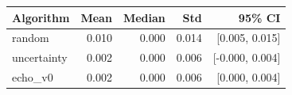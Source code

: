 \begin{tabular}{lrrrr}
\hline
Algorithm & Mean & Median & Std & 95\% CI \\
\hline
random & 0.010 & 0.000 & 0.014 & [0.005, 0.015] \\
uncertainty & 0.002 & 0.000 & 0.006 & [-0.000, 0.004] \\
echo\_v0 & 0.002 & 0.000 & 0.006 & [0.000, 0.004] \\
\hline
\end{tabular}
